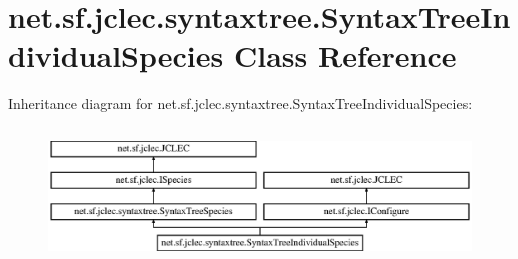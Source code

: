 \hypertarget{classnet_1_1sf_1_1jclec_1_1syntaxtree_1_1_syntax_tree_individual_species}{\section{net.\-sf.\-jclec.\-syntaxtree.\-Syntax\-Tree\-Individual\-Species Class Reference}
\label{classnet_1_1sf_1_1jclec_1_1syntaxtree_1_1_syntax_tree_individual_species}
}
Inheritance diagram for net.\-sf.\-jclec.\-syntaxtree.\-Syntax\-Tree\-Individual\-Species\-:\begin{figure}[H]
\begin{center}
\leavevmode
\includegraphics[height=3.601286cm]{classnet_1_1sf_1_1jclec_1_1syntaxtree_1_1_syntax_tree_individual_species}
\end{center}
\end{figure}
